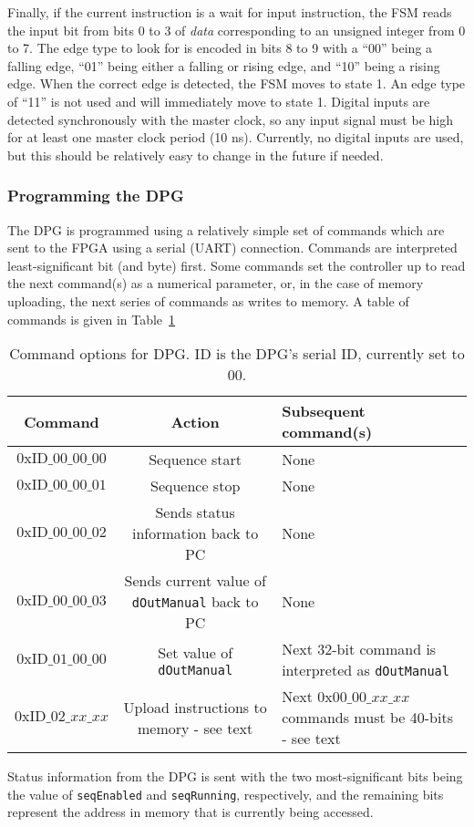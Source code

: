 \documentclass[]{article}
\begin{document}
Finally, if the current instruction is a wait for input instruction, the FSM reads the input bit from bits 0 to 3 of \emph{data} corresponding to an unsigned integer from 0 to 7.  The edge type to look for is encoded in bits 8 to 9 with a ``00'' being a falling edge, ``01'' being either a falling or rising edge, and ``10'' being a rising edge.  When the correct edge is detected, the FSM moves to state 1.  An edge type of ``11'' is not used and will immediately move to state 1.  Digital inputs are detected synchronously with the master clock, so any input signal must be high for at least one master clock period (10 ns).  Currently, no digital inputs are used, but this should be relatively easy to change in the future if needed.

\subsubsection{Programming the DPG}
\label{sssec:programming-dpg}
The DPG is programmed using a relatively simple set of commands which are sent to the FPGA using a serial (UART) connection.  Commands are interpreted least-significant bit (and byte) first.  Some commands set the controller up to read the next command(s) as a numerical parameter, or, in the case of memory uploading, the next series of commands as writes to memory.  A table of commands is given in Table~\ref{tb:commands}
\begin{table}[htbp]
	\centering
	\begin{tabular}{c|c|p{5cm}}
		Command							&	Action													&	Subsequent command(s)\\\hline
		$0\mathrm{xID}\_00\_00\_00$		&	Sequence start											&	None\\\hline
		$0\mathrm{xID}\_00\_00\_01$		&	Sequence stop											&	None\\\hline
		$0\mathrm{xID}\_00\_00\_02$		&	Sends status information back to PC						&	None\\\hline
		$0\mathrm{xID}\_00\_00\_03$		&	Sends current value of \verb|dOutManual| back to PC		&	None\\\hline
		$0\mathrm{xID}\_01\_00\_00$		&	Set value of \verb|dOutManual|							&	Next 32-bit command is interpreted as \verb|dOutManual|\\\hline
		$0\mathrm{xID}\_02\_xx\_xx$		&	Upload instructions to memory - see text				&	Next $0\mathrm{x}00\_00\_xx\_xx$ commands must be 40-bits - see text\\\hline
	\end{tabular}
	\caption{Command options for DPG.  ID is the DPG's serial ID, currently set to $00$.}
	\label{tb:commands}
\end{table}
Status information from the DPG is sent with the two most-significant bits being the value of \verb|seqEnabled| and \verb|seqRunning|, respectively, and the remaining bits represent the address in memory that is currently being accessed.
\end{document}
